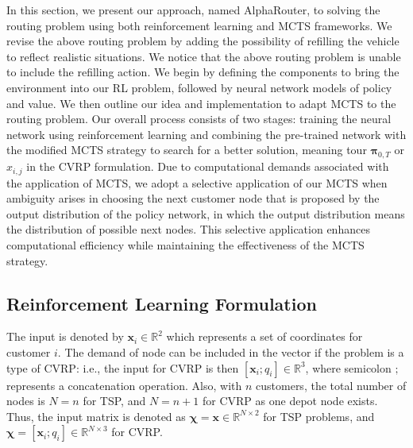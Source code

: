 \documentclass{article}
\newcommand\HWG[1]{ {\color{blue}#1} }
\begin{document}
In this section, we present our approach, named AlphaRouter, to solving the routing problem using both reinforcement learning and MCTS frameworks.
We revise the above routing problem by adding the possibility of refilling the vehicle to reflect realistic situations. We notice that the above routing problem is unable to include the refilling action.
We begin by defining the components to bring the environment into our RL problem, followed by neural network models of policy and value. We then outline our idea and implementation to adapt MCTS to the routing problem. Our overall process consists of two stages: training the neural network using reinforcement learning and combining the pre-trained network with the modified MCTS strategy to search for a better solution, meaning tour ${\boldsymbol{\pi}_{0,T}}$ or $x_{i,j}$ in the CVRP formulation.
Due to computational demands associated with the application of MCTS, we adopt a selective application of our MCTS when ambiguity arises in choosing the next customer node that is proposed by the output distribution of the policy network, in which the output distribution means the distribution of possible next nodes. This selective application enhances computational efficiency while maintaining the effectiveness of the MCTS strategy.

\subsection{Reinforcement Learning Formulation}

The input is denoted by $\mathbf{x}_i \in \mathbb{R}^2$ which represents a set of coordinates for customer $i$. The demand of node can be included in the vector if the problem is a type of CVRP: i.e., the input for CVRP is then $[\mathbf{x}_i; q_i] \in \mathbb{R}^3$, where semicolon $;$ represents a concatenation operation. Also, with $n$ customers, the total number of nodes is $N=n$ for TSP, and $N=n+1$ for CVRP as one depot node exists. Thus, the input matrix is denoted as $\mathbf{\chi} = \mathbf{x} \in \mathbb{R}^{N\times 2}$ for TSP problems, and $\mathbf{\chi} = [ \mathbf{x}_i; q_i] \in \mathbb{R}^{N \times 3}$ for CVRP.

\end{document}
